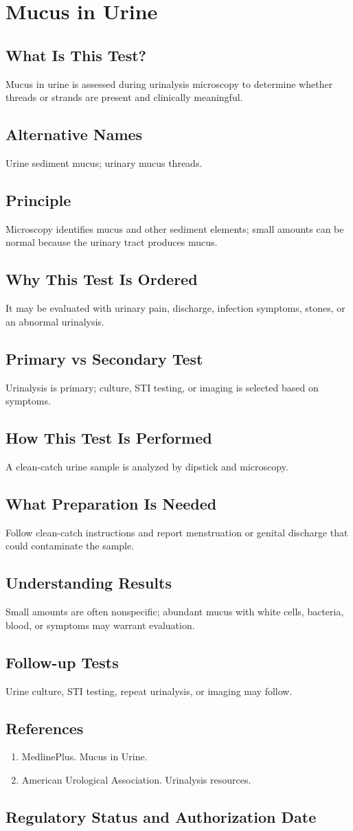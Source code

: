 \chapter{Mucus in Urine}
\section*{What Is This Test?} Mucus in urine is assessed during urinalysis microscopy to determine whether threads or strands are present and clinically meaningful.\section*{Alternative Names} Urine sediment mucus; urinary mucus threads.\section*{Principle} Microscopy identifies mucus and other sediment elements; small amounts can be normal because the urinary tract produces mucus.\section*{Why This Test Is Ordered} It may be evaluated with urinary pain, discharge, infection symptoms, stones, or an abnormal urinalysis.\section*{Primary vs Secondary Test} Urinalysis is primary; culture, STI testing, or imaging is selected based on symptoms.\section*{How This Test Is Performed} A clean-catch urine sample is analyzed by dipstick and microscopy.\section*{What Preparation Is Needed} Follow clean-catch instructions and report menstruation or genital discharge that could contaminate the sample.\section*{Understanding Results} Small amounts are often nonspecific; abundant mucus with white cells, bacteria, blood, or symptoms may warrant evaluation.\section*{Follow-up Tests} Urine culture, STI testing, repeat urinalysis, or imaging may follow.\section*{References} \begin{enumerate}\item MedlinePlus. Mucus in Urine.\item American Urological Association. Urinalysis resources.\end{enumerate}\clearpage\section*{Regulatory Status and Authorization Date}\clearpage
